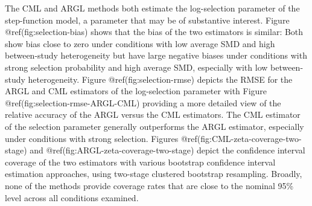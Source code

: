 \documentclass[
]{article}
\begin{document}
The CML and ARGL methods both estimate the log-selection parameter of
the step-function model, a parameter that may be of substantive
interest. Figure @ref(fig:selection-bias) shows that the bias of the two
estimators is similar: Both show bias close to zero under conditions
with low average SMD and high between-study heterogeneity but have large
negative biases under conditions with strong selection probability and
high average SMD, especially with low between-study heterogeneity.
Figure @ref(fig:selection-rmse) depicts the RMSE for the ARGL and CML
estimators of the log-selection parameter with Figure
@ref(fig:selection-rmse-ARGL-CML) providing a more detailed view of the
relative accuracy of the ARGL versus the CML estimators. The CML
estimator of the selection parameter generally outperforms the ARGL
estimator, especially under conditions with strong selection. Figures
@ref(fig:CML-zeta-coverage-two-stage) and
@ref(fig:ARGL-zeta-coverage-two-stage) depict the confidence interval
coverage of the two estimators with various bootstrap confidence
interval estimation approaches, using two-stage clustered bootstrap
resampling. Broadly, none of the methods provide coverage rates that are
close to the nominal 95\% level across all conditions examined.
\end{document}
